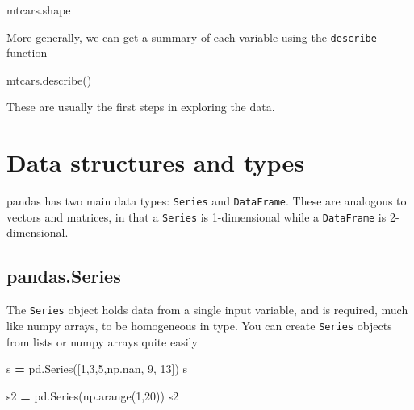 \documentclass[
  letterpaper,
]{scrbook}
\newenvironment{Shaded}{\begin{snugshade}}{\end{snugshade}}
\newcommand{\DecValTok}[1]{\textcolor[rgb]{0.00,0.00,0.81}{#1}}
\newcommand{\NormalTok}[1]{#1}
\newcommand{\OperatorTok}[1]{\textcolor[rgb]{0.81,0.36,0.00}{\textbf{#1}}}
\begin{document}
\begin{Shaded}
\begin{Highlighting}[]
\NormalTok{mtcars.shape}
\end{Highlighting}
\end{Shaded}

More generally, we can get a summary of each variable using the \texttt{describe} function

\begin{Shaded}
\begin{Highlighting}[]
\NormalTok{mtcars.describe()}
\end{Highlighting}
\end{Shaded}

These are usually the first steps in exploring the data.

\hypertarget{data-structures-and-types}{%
\section{Data structures and types}\label{data-structures-and-types}}

pandas has two main data types: \texttt{Series} and \texttt{DataFrame}. These are analogous to vectors and matrices, in that a \texttt{Series} is 1-dimensional while a \texttt{DataFrame} is 2-dimensional.

\hypertarget{pandas.series}{%
\subsection{pandas.Series}\label{pandas.series}}

The \texttt{Series} object holds data from a single input variable, and is required, much like numpy arrays, to be homogeneous in type. You can create \texttt{Series} objects from lists or numpy arrays quite easily

\begin{Shaded}
\begin{Highlighting}[]
\NormalTok{s }\OperatorTok{=}\NormalTok{ pd.Series([}\DecValTok{1}\NormalTok{,}\DecValTok{3}\NormalTok{,}\DecValTok{5}\NormalTok{,np.nan, }\DecValTok{9}\NormalTok{, }\DecValTok{13}\NormalTok{])}
\NormalTok{s}
\end{Highlighting}
\end{Shaded}

\begin{Shaded}
\begin{Highlighting}[]
\NormalTok{s2 }\OperatorTok{=}\NormalTok{ pd.Series(np.arange(}\DecValTok{1}\NormalTok{,}\DecValTok{20}\NormalTok{))}
\NormalTok{s2}
\end{Highlighting}
\end{Shaded}
\end{document}

